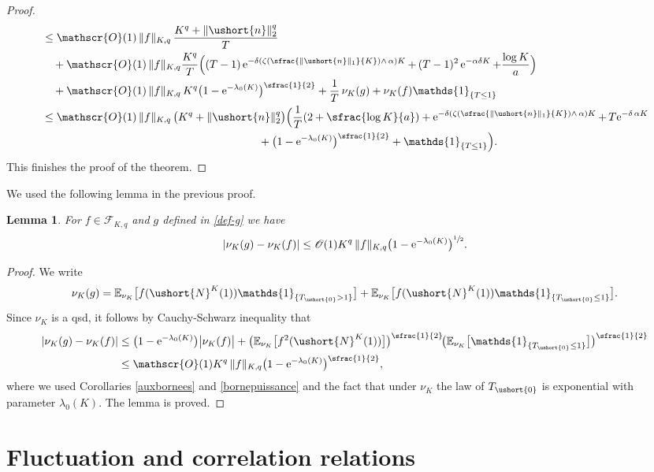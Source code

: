 \documentclass[10pt]{amsart}
\newcommand{\Psfrac}[2]{(\sfrac{#1}{#2})}
\newcommand{\scaleto}[2]{#1}
\let\mathcal\mathscr
\numberwithin{equation}{section}
\theoremstyle{plain}
\newtheorem{lemma}[theorem]{Lemma}
\theoremstyle{definition}
\newcommand{\E}{{\mathbb{E}}}
\newcommand{\Oun}{\mathcal{O}(1)}
\newcommand{\sK}{K}
\newcommand{\un}{\mathds{1}}
\newcommand{\vecn}{\ushort{n}}
\newcommand{\veczer}{\ushort{0}}
\newcommand{\leproc}{\ushort{N}^{K}}
\newcommand{\nuk}{\nu_{K}}\let\snuk\nuk
\newcommand{\e}{\operatorname{e}}
\newcommand{\normdeux}[1]{\|#1\|_{2}}\let\snormdeux\normdeux
\begin{document}
\begin{proof}
\begin{align*}
& \le \Oun\, \|f\|_{\sK,q}\,\frac{K^{q}+\normdeux{\vecn}^{\scaleto{q}{3.6pt}}}{T}\\
& \quad +\Oun\, \|f\|_{\sK,q} \frac{K^q}{T}\Bigl((T-1)\e^{-\delta\left(\zeta\Psfrac{\|\vecn\|_{1}}{K}\wedge\,\alpha\right)K}+\, (T-1)^2\e^{-\alpha\delta K}+\frac{\log K}{a}\Bigr)\\
& \quad + \Oun\, \|f\|_{\sK,q}\, K^q \bigl(1-\e^{-\lambda_0(K)}\bigr)^{\sfrac{1}{2}} + \frac{1}{T}\, \nuk(g) +
\nuk(f)\un_{\{T\leq 1\}}\\
& \leq \Oun\, \|f\|_{\sK,q}\, \bigl(K^{q}+\normdeux{\vecn}^{\scaleto{q}{3.6pt}}\bigr) \Bigl(\frac{1}{T}(2+\sfrac{\log K}{a }) +
\e^{-\delta\left(\zeta\Psfrac{\|\vecn\|_{1}}{K}\wedge\,\alpha\right)K} +\, T\!\e^{-\delta\,\alpha K}\\
& \hspace*{6.9cm} + \bigl(1-\e^{-\lambda_0(K)}\bigr)^{\sfrac{1}{2}} + \un_{\{T\leq 1\}}\Bigr).
\end{align*}
This finishes the proof of the theorem.
\end{proof}

We used the following lemma in the previous proof.
\begin{lemma}
\label{f-et-g}
For $f\in \mathscr{F}\!_{\sK,q}$ and $g$ defined in \eqref{def-g} we have
\[
|\nuk(g)-\nuk(f)|\leq \Oun K^q\, \|f\|_{\sK,q}\bigl(1-\e^{-\lambda_0(K)}\bigr)^{\sfrac{1}{2}}.
\]
\end{lemma}
\begin{proof}
We write
\[
\nuk(g)= \E_{\snuk}\bigl[f(\leproc(1)) \un_{\{T_{\veczer}>1\}}\bigr]
+
\E_{\snuk}\bigl[f(\leproc(1)) \un_{\{T_{\veczer}\leq 1\}}\bigr].
\]
Since $\nuk$ is a qsd, it follows by Cauchy-Schwarz inequality that
\begin{align*}
|\nuk(g)-\nuk(f)|
& \leq \bigl(1-\e^{-\lambda_0(K)}\bigr)\big|\nuk(f)\big|+ \bigl(\E_{\snuk}\bigl[f^2(\leproc(1))\bigr]\bigr)^{\sfrac{1}{2}} \!
\bigl(\E_{\snuk}\bigl[\un_{\{T_{\veczer}\leq 1\}}\bigr] \bigr)^{\sfrac{1}{2}}\\
& \leq\Oun K^q\, \|f\|_{\sK,q} \bigl(1-\e^{-\lambda_0(K)}\bigr)^{\sfrac{1}{2}},
\end{align*}
where we used Corollaries \ref{auxbornees} and \ref{bornepuissance} and the fact that under $\nuk$ the law of $T_{\veczer}
$ is exponential with parameter $\lambda_0(K)$. The lemma is proved.
\end{proof}

\section{Fluctuation and correlation relations}
\label{chaleur}
\end{document}
